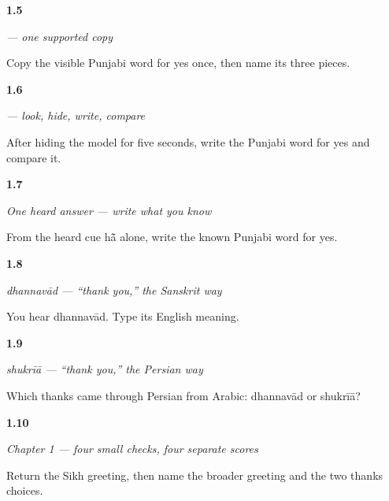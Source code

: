 \noindent\begin{minipage}[t]{\linewidth}
\raggedright
\hypertarget{review-PA-W01-haan-guided-copy-check}{\textbf{1.5}} \emph{ — one supported copy}\par
\small Copy the visible Punjabi word for yes once, then name its three pieces.
\end{minipage}\par\medskip

\noindent\begin{minipage}[t]{\linewidth}
\raggedright
\hypertarget{review-PA-W01-haan-delayed-copy-check}{\textbf{1.6}} \emph{ — look, hide, write, compare}\par
\small After hiding the model for five seconds, write the Punjabi word for yes and compare it.
\end{minipage}\par\medskip

\noindent\begin{minipage}[t]{\linewidth}
\raggedright
\hypertarget{review-PA-W01-haan-dictation-answer}{\textbf{1.7}} \emph{One heard answer — write what you know}\par
\small From the heard cue hā̃ alone, write the known Punjabi word for yes.
\end{minipage}\par\medskip

\noindent\begin{minipage}[t]{\linewidth}
\raggedright
\hypertarget{review-PA-C01-dhanvaad-meaning}{\textbf{1.8}} \emph{\emph{dhannavād} — “thank you,” the Sanskrit way}\par
\small You hear dhannavād. Type its English meaning.
\end{minipage}\par\medskip

\noindent\begin{minipage}[t]{\linewidth}
\raggedright
\hypertarget{review-PA-C01-shukriya-source}{\textbf{1.9}} \emph{\emph{shukrīā} — “thank you,” the Persian way}\par
\small Which thanks came through Persian from Arabic: dhannavād or shukrīā?
\end{minipage}\par\medskip

\noindent\begin{minipage}[t]{\linewidth}
\raggedright
\hypertarget{review-PA-C01-practice-greetings}{\textbf{1.10}} \emph{Chapter 1 — four small checks, four separate scores}\par
\small Return the Sikh greeting, then name the broader greeting and the two thanks choices.
\end{minipage}\par\medskip

